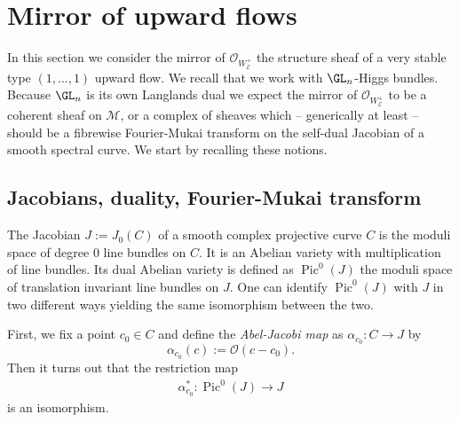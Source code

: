 \documentclass[12pt]{article}
\numberwithin{equation}{section}
\theoremstyle{remark}
\theoremstyle{definition}
\numberwithin{theorem}{section}
\def\beq{\begin{eqnarray}}
\def\eeq{\end{eqnarray}}
\def\calE{{\mathcal E}}
\DeclareMathOperator{\Pic}{Pic}
\def\L{\mathbb{L}}
\def\M{{\mathcal{M}}}
\def\calO{{\mathcal O}}
\renewcommand{\1}{\mathbbm{1}}
\begin{document}

%









\section{Mirror of  upward flows}
\label{mirror}

In this section we consider the mirror of $\calO_{W^+_\calE}$ the structure sheaf of a very stable type $(1,...,1)$ upward flow. We recall that we work with $\GL_n$-Higgs bundles. Because $\GL_n$ is its own Langlands dual we expect the mirror of $\calO_{W^+_\calE}$ to be a coherent sheaf on $\M$, or a complex of sheaves which -- generically at least -- should be a fibrewise Fourier-Mukai transform on the self-dual Jacobian of a smooth spectral curve. We start by recalling these notions. 
\subsection{Jacobians, duality, Fourier-Mukai transform}
The Jacobian $J:=J_0(C)$ of a smooth complex projective curve $C$ is the moduli space of degree $0$ line bundles on $C$. It is an Abelian variety with multiplication of line bundles. %
Its dual Abelian variety is defined as $\Pic^0(J)$ the moduli space of translation invariant line bundles on $J$. One can identify $\Pic^0(J)$ with $J$ in two different ways yielding the same isomorphism between the two. 

First, we fix a point $c_0\in C$ and define the {\em Abel-Jacobi map} as $\alpha_{c_0}:C\to J$ by $$\alpha_{c_0}(c):=\calO(c-c_0).$$ Then it turns out \cite[Lemma 11.3.1]{birkenhake-lange} that the  restriction map \beq\label{ajiso} \alpha_{c_0}^*:\Pic^0(J)\to J\eeq is an isomorphism. 
\end{document}
